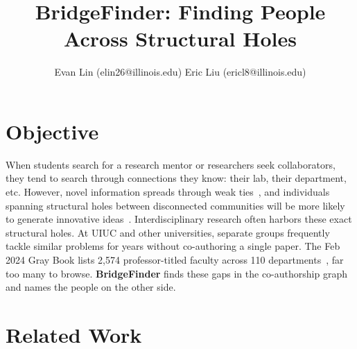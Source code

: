 \documentclass[sigconf,nonacm]{acmart}
\begin{document}
\title{BridgeFinder: Finding People Across Structural Holes}

\author{Evan Lin (elin26@illinois.edu) \quad Eric Liu (ericl8@illinois.edu)}

\begin{teaserfigure}
  \centering
  \vspace{-6pt}
  \scalebox{0.74}{}
  \caption{Core flow: (1) co-authorship communities, with a structural hole dashed; (2) ranked researchers across the hole; (3) their matching papers and an introduction path.}
  \label{fig:flow}
  \vspace{-4pt}
\end{teaserfigure}

\maketitle

\section{Objective}
When students search for a research mentor or researchers seek collaborators, they tend to search through connections they know: their lab, their department, etc. However, novel information spreads through weak ties~\cite{granovetter1973}, and individuals spanning structural holes between disconnected communities will be more likely to generate innovative ideas~\cite{burt2004}. Interdisciplinary research often harbors these exact structural holes. At UIUC and other universities, separate groups frequently tackle similar problems for years without co-authoring a single paper. The Feb 2024 Gray Book lists 2,574 professor-titled faculty across 110 departments~\cite{graybook2024}, far too many to browse. \textbf{BridgeFinder} finds these gaps in the co-authorship graph and names the people on the other side. 

\section{Related Work}
\end{document}
